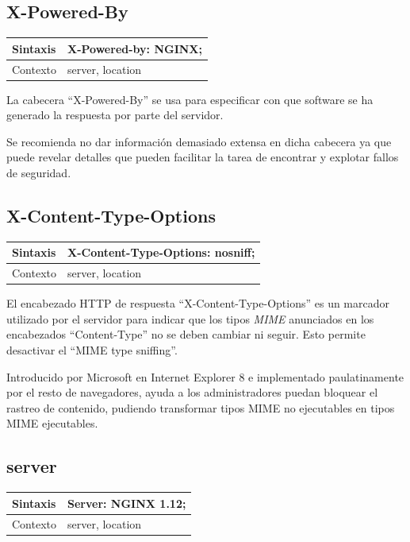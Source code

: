 \subsection{X-Powered-By}

\begin{table}[H]
\begin{tabular}{|l|l|}
\hline
Sintaxis      & X-Powered-by: NGINX; \\ \hline
Contexto      & server, location     \\ \hline
\end{tabular}
\end{table}

La cabecera ``X-Powered-By'' se usa para especificar con que software se ha generado la respuesta por parte del servidor.

\bigskip
Se recomienda no dar información demasiado extensa en dicha cabecera ya que puede revelar detalles que pueden facilitar la tarea de encontrar y explotar fallos de seguridad.


\subsection{X-Content-Type-Options}

\begin{table}[H]
\begin{tabular}{|l|l|}
\hline
Sintaxis      & X-Content-Type-Options: nosniff; \\ \hline
Contexto      & server, location     \\ \hline
\end{tabular}
\end{table}

El encabezado HTTP de respuesta ``X-Content-Type-Options'' es un marcador utilizado por el servidor para indicar que los tipos \textit{MIME} anunciados en los encabezados ``Content-Type'' no se deben cambiar ni seguir. Esto permite desactivar el ``MIME type sniffing''.

\bigskip
Introducido por Microsoft en Internet Explorer 8 e implementado paulatinamente por el resto de navegadores, ayuda a los administradores puedan bloquear el rastreo de contenido, pudiendo transformar tipos MIME no ejecutables en tipos MIME ejecutables.

\subsection{server}

\begin{table}[H]
\begin{tabular}{|l|l|}
\hline
Sintaxis      & Server: NGINX 1.12; \\ \hline
Contexto      & server, location     \\ \hline
\end{tabular}
\end{table}

